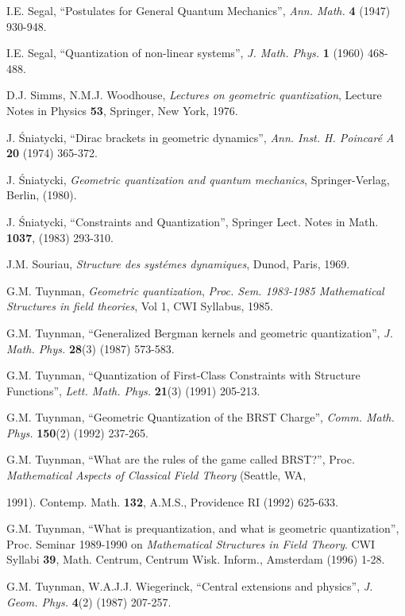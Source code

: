 \documentclass[12pt]{article}
\theoremstyle{plain}
\begin{document}
\begin{thebibliography}{55}
{\sc I.E. Segal},
``Postulates for General Quantum Mechanics'',
{\it Ann. Math.} {\bf 4} (1947) 930-948.

{\sc I.E. Segal},
``Quantization of non-linear systems'',
{\it J. Math. Phys.} {\bf 1} (1960) 468-488.

{\sc D.J. Simms, N.M.J. Woodhouse},
{\it Lectures on geometric quantization\/},
Lecture Notes in Physics {\bf 53},
Springer, New York, 1976.

{\sc J. \'Sniatycki},
``Dirac brackets in geometric dynamics'',
{\it Ann. Inst. H. Poincar\'e A} {\bf 20} (1974) 365-372.

{\sc J. \'Sniatycki},
{\it Geometric quantization and quantum mechanics\/},
Springer-Verlag, Berlin, (1980).

{\sc J. \'Sniatycki},
``Constraints and Quantization'',
Springer Lect. Notes in Math. {\bf 1037}, (1983) 293-310.

{\sc J.M. Souriau},
{\it Structure des syst\'emes dynamiques\/},
Dunod, Paris, 1969.

{\sc G.M. Tuynman},
{\it Geometric quantization},
{\it Proc. Sem. 1983-1985 Mathematical Structures in field theories},
Vol 1, CWI Syllabus, 1985.

{\sc G.M. Tuynman},
``Generalized Bergman kernels and geometric quantization'',
{\it J. Math. Phys.} {\bf 28}(3) (1987) 573-583.

{\sc G.M. Tuynman},
``Quantization of First-Class Constraints with Structure Functions'',
{\it Lett. Math. Phys.} {\bf 21}(3) (1991) 205-213.

{\sc G.M. Tuynman},
``Geometric Quantization of the BRST Charge'',
{\it Comm. Math. Phys.} {\bf 150}(2) (1992) 237-265.

{\sc G.M. Tuynman},
``What are the rules of the game called BRST?'',
Proc. {\it Mathematical Aspects of Classical Field Theory} (Seattle, WA,

1991).
Contemp. Math. {\bf 132}, A.M.S., Providence RI (1992) 625-633.

{\sc G.M. Tuynman},
``What is prequantization, and   what is geometric quantization'',
Proc. Seminar 1989-1990 on
{\it Mathematical Structures in Field Theory}.
CWI Syllabi {\bf 39}, Math. Centrum, Centrum Wisk. Inform., Amsterdam
(1996) 1-28.

{\sc G.M. Tuynman, W.A.J.J. Wiegerinck},
``Central extensions and physics'',
{\it J. Geom. Phys.} {\bf 4}(2) (1987) 207-257.


\end{thebibliography}
\end{document}
